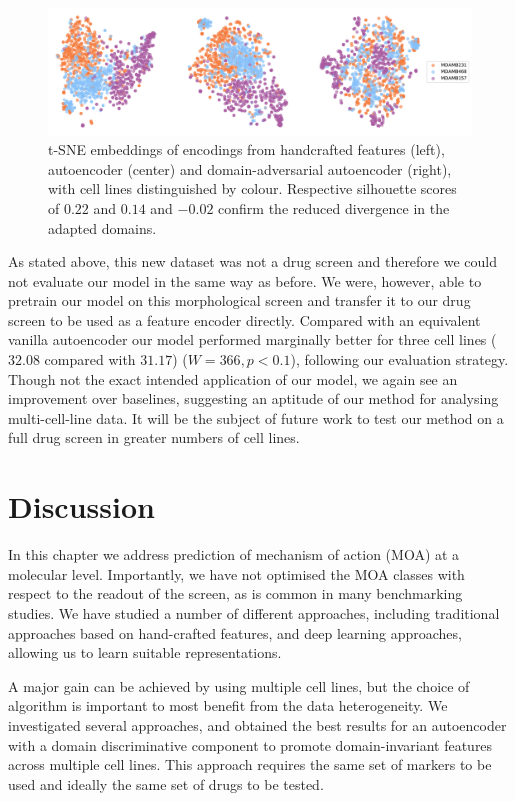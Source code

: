 \begin{figure}[htb]
\centering
  \includegraphics[width=\linewidth]{img/3_cell_lines.pdf}
  \caption{t-SNE embeddings of encodings from handcrafted features (left), autoencoder (center) and domain-adversarial autoencoder (right), with cell lines distinguished by colour. Respective silhouette scores of $0.22$ and $0.14$ and $-0.02$ confirm the reduced divergence in the adapted domains.}
\label{fig:3_cell_lines}
\end{figure}

As stated above, this new dataset was not a drug screen and therefore we could not evaluate our model in the same way as before. We were, however, able to pretrain our model on this morphological screen and transfer it to our drug screen to be used as a feature encoder directly. Compared with an equivalent vanilla autoencoder our model performed marginally better for three cell lines ($32.08$ compared with $31.17$) ($W = 366, p < 0.1$), following our evaluation strategy.
Though not the exact intended application of our model, we again see an improvement over baselines, suggesting an aptitude of our method for analysing multi-cell-line data. It will be the subject of future work to test our method on a full drug screen in greater numbers of cell lines.

\section{Discussion}
\label{sec:discussion}

In this chapter we address prediction of mechanism of action (MOA) at a molecular level. Importantly, we have not optimised the MOA classes with respect to the readout of the screen, as is common in many benchmarking studies. We have studied a number of different approaches, including traditional approaches based on hand-crafted features, and deep learning approaches, allowing us to learn suitable representations.

A major gain can be achieved by using multiple cell lines, but the choice of algorithm is important to most benefit from the data heterogeneity. We investigated several approaches, and obtained the best results for an autoencoder with a domain discriminative component to promote domain-invariant features across multiple cell lines. This approach requires the same set of markers to be used and ideally the same set of drugs to be tested.


